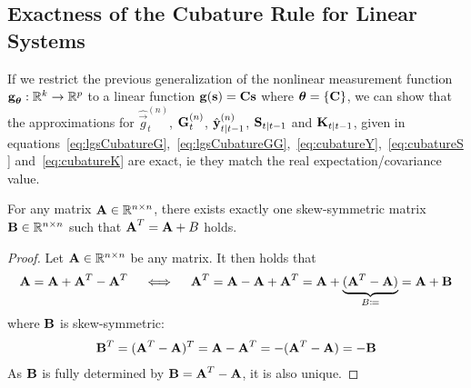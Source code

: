 	\subsection{Exactness of the Cubature Rule for Linear Systems}
		If we restrict the previous generalization of the nonlinear measurement function \( \boldsymbol{\mathrm{g}}_{\boldsymbol{\mathrm{\theta}}} : \mathbb{R}^k \to \mathbb{R}^p \) to a linear function \( \boldsymbol{\mathrm{g}}(\boldsymbol{\mathrm{s}}) = \boldsymbol{\mathrm{C}} \boldsymbol{\mathrm{s}} \) where \( \boldsymbol{\mathrm{\theta}} = \{ \boldsymbol{\mathrm{C}} \} \), we can show that the approximations for \( \hat{\vec{g}}_t^{(n)} \), \( \boldsymbol{\mathrm{G}}_t^{(n)} \), \( \hat{\boldsymbol{\mathrm{y}}}_{t \vert t - 1}^{(n)} \), \( \boldsymbol{\mathrm{S}}_{t \vert t - 1} \) and \( \boldsymbol{\mathrm{K}}_{t \vert t - 1} \), given in equations~\eqref{eq:lgsCubatureG},~\eqref{eq:lgsCubatureGG},~\eqref{eq:cubatureY},~\eqref{eq:cubatureS} and~\eqref{eq:cubatureK} are exact, \ac{ie} they match the real expectation/covariance value.
		
		\begin{lemma}
			For any matrix \( \boldsymbol{\mathrm{A}} \in \mathbb{R}^{n \times n} \), there exists exactly one skew-symmetric matrix \( \boldsymbol{\mathrm{B}} \in \mathbb{R}^{n \times n} \) such that \( \boldsymbol{\mathrm{A}}^T = \boldsymbol{\mathrm{A}} + B \) holds.
		\end{lemma}
		\begin{proof}
			Let \( \boldsymbol{\mathrm{A}} \in \mathbb{R}^{n \times n} \) be any matrix. It then holds that
			\begin{align*}
				\boldsymbol{\mathrm{A}} = \boldsymbol{\mathrm{A}} + \boldsymbol{\mathrm{A}}^T - \boldsymbol{\mathrm{A}}^T \quad\iff\quad \boldsymbol{\mathrm{A}}^T = \boldsymbol{\mathrm{A}} - \boldsymbol{\mathrm{A}} + \boldsymbol{\mathrm{A}}^T = \boldsymbol{\mathrm{A}} + \underbrace{(\boldsymbol{\mathrm{A}}^T - \boldsymbol{\mathrm{A}})}_{B \coloneqq} = \boldsymbol{\mathrm{A}} + \boldsymbol{\mathrm{B}}
			\end{align*}
			where \( \boldsymbol{\mathrm{B}} \) is skew-symmetric:
			\begin{align*}
				\boldsymbol{\mathrm{B}}^T = (\boldsymbol{\mathrm{A}}^T - \boldsymbol{\mathrm{A}})^T = \boldsymbol{\mathrm{A}} - \boldsymbol{\mathrm{A}}^T = -(\boldsymbol{\mathrm{A}}^T - \boldsymbol{\mathrm{A}}) = -\boldsymbol{\mathrm{B}}
			\end{align*}
			As \(\boldsymbol{\mathrm{B}}\) is fully determined by \( \boldsymbol{\mathrm{B}} = \boldsymbol{\mathrm{A}}^T - \boldsymbol{\mathrm{A}} \), it is also unique.
		\end{proof}
		
